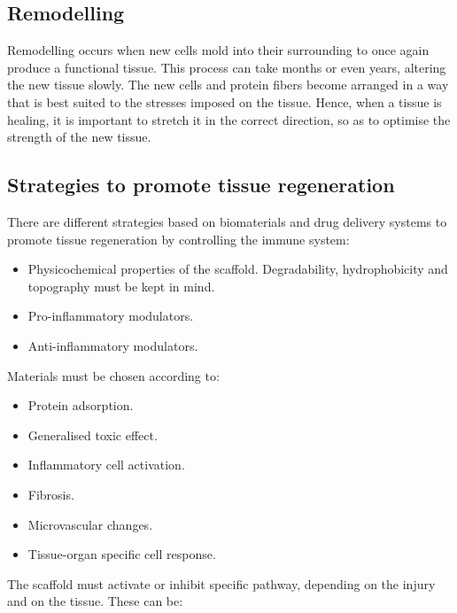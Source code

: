	\subsection{Remodelling}
	Remodelling occurs when new cells mold into their surrounding to once again produce a functional tissue.
	This process can take months or even years, altering the new tissue slowly.
	The new cells and protein fibers become arranged in a way that is best suited to the stresses imposed on the tissue.
	Hence, when a tissue is healing, it is important to stretch it in the correct direction, so as to optimise the strength of the new tissue.

	\subsection{Strategies to promote tissue regeneration}
	There are different strategies based on biomaterials and drug delivery systems to promote tissue regeneration by controlling the immune system:

	\begin{multicols}{2}
		\begin{itemize}
			\item Physicochemical properties of the scaffold.
				Degradability, hydrophobicity and topography must be kept in mind.
			\item Pro-inflammatory modulators.
			\item Anti-inflammatory modulators.
		\end{itemize}
	\end{multicols}

	Materials must be chosen according to:

	\begin{multicols}{2}
		\begin{itemize}
			\item Protein adsorption.
			\item Generalised toxic effect.
			\item Inflammatory cell activation.
			\item Fibrosis.
			\item Microvascular changes.
			\item Tissue-organ specific cell response.
		\end{itemize}
	\end{multicols}

	The scaffold must activate or inhibit specific pathway, depending on the injury and on the tissue.
	These can be:

